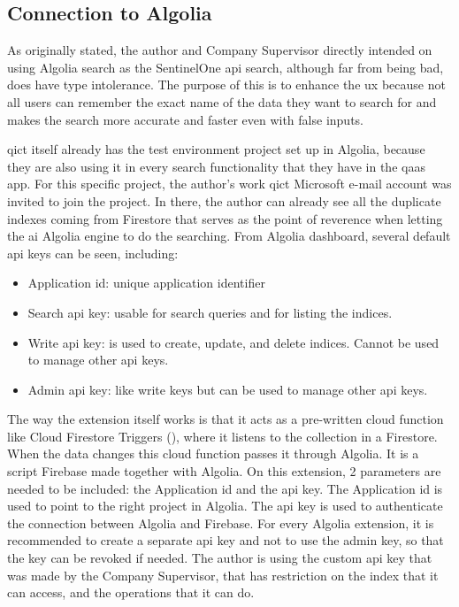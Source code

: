 \subsection{Connection to Algolia}

As originally stated, the author and Company Supervisor directly intended on using Algolia search as the SentinelOne
\acrshort{api} search, although far from being bad, does have type intolerance. The purpose of this is to enhance the \acrshort{ux}
because not all users can remember the exact name of the data they want to search for and makes the search more accurate and faster
even with false inputs.

\acrshort{qict} itself already has the test environment project set up in Algolia, because they are also using it in every search functionality
that they have in the \acrshort{qaas} app. For this specific project, the author's work \acrshort{qict} Microsoft e-mail account was invited to join
the project. In there, the author can already see all the duplicate indexes coming from Firestore that serves as the point of reverence when letting
the \acrshort{ai} Algolia engine to do the searching. From Algolia dashboard, several default \acrshort{api} keys can be seen, including:
\begin{itemize}
  \item Application \acrshort{id}: unique application identifier
  \item Search \acrshort{api} key: usable for search queries and for listing the indices.
  \item Write \acrshort{api} key: is used to create, update, and delete indices. Cannot be used to manage other \acrshort{api} keys.
  \item Admin \acrshort{api} key: like write keys but can be used to manage other \acrshort{api} keys.
\end{itemize}

The way the extension itself works is that it acts as a pre-written cloud function like Cloud Firestore Triggers (\textit{\cite{cloudTriggers}}),
where it listens to the collection in a Firestore. When the data changes this cloud function passes it through Algolia. It is a script Firebase made
together with Algolia. On this extension, 2 parameters are needed to be included: the Application \acrshort{id} and the \acrshort{api} key. The Application
\acrshort{id} is used to point to the right project in Algolia. The \acrshort{api} key is used to authenticate the connection between Algolia and Firebase.
For every Algolia extension, it is recommended to create a separate \acrshort{api} key and not to use the admin key, so that the key can be revoked if needed.
The author is using the custom \acrshort{api} key that was made by the Company Supervisor, that has restriction on the index that it can access, and the
operations that it can do.

